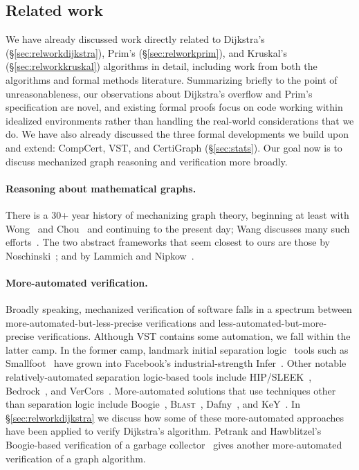 \subsection{Related work}

We have already discussed work directly related to Dijkstra's (\S\ref{sec:relworkdijkstra}), Prim's (\S\ref{sec:relworkprim}), and Kruskal's (\S\ref{sec:relworkkruskal}) algorithms in detail, including work from both the algorithms and formal methods literature.  Summarizing briefly to the point of unreasonableness, our observations about Dijkstra's overflow and Prim's specification are novel, and existing formal proofs focus on code working within idealized environments rather than handling the real-world considerations that we do.  We have also already discussed the three formal developments we
build upon and extend: CompCert, VST, and CertiGraph (\S\ref{sec:stats}).  Our goal now is to discuss mechanized graph reasoning and verification more broadly.

\paragraph{Reasoning about mathematical graphs.}
There is a 30+ year history of mechanizing graph theory, beginning at least with Wong~\cite{wong1991} and Chou~\cite{chou1994formal} and continuing to the present day; Wang discusses many such efforts~\cite[\S3.3]{shengyi:thesis}.  The two abstract frameworks that seem closest to ours are those by Noschinski~\cite{Noschinski2015}; and by Lammich and Nipkow~\cite{DBLP:journals/afp/LammichN19}.  

\paragraph{More-automated verification.}
Broadly speaking, mechanized verification of software falls in a spectrum between more-automated-but-less-precise verifications and less-automated-but-more-precise verifications.  Although VST contains some automation, we fall within the latter camp.  In the former camp, landmark initial separation logic~\cite{o2001local} tools such as Smallfoot~\cite{berdine:smallfoot} have grown into Facebook's industrial-strength Infer~\cite{calcagno2015moving}.  Other notable relatively-automated separation logic-based tools include HIP/SLEEK~\cite{chin:hipsleek}, Bedrock~\cite{chlipala:bedrock}, and VerCors~\cite{DBLP:conf/fm/BlomH14}.  More-automated solutions that use techniques other than separation logic include Boogie~\cite{barnett2005boogie}, \textsc{Blast}~\cite{DBLP:journals/sttt/BeyerHJM07}, Dafny~\cite{leino10}, and KeY~\cite{DBLP:series/lncs/10001}.  In \S\ref{sec:relworkdijkstra} we discuss how some of these more-automated approaches have been applied to verify Dijkstra's algorithm. Petrank and Hawblitzel's Boogie-based verification of a garbage collector~\cite{gcexample2} gives another more-automated verification of a graph algorithm.

